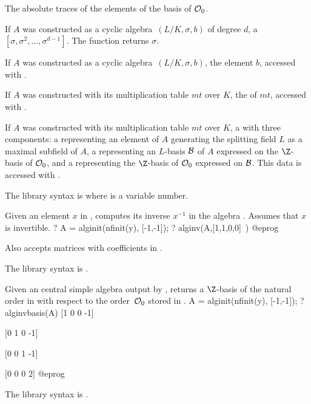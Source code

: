  \item The absolute traces of the elements of the basis of ${\cal O}_0$.

 \item If $A$ was constructed as a cyclic algebra~$(L/K,\sigma,b)$ of degree
$d$, a  $[\sigma,\sigma^2,\dots,\sigma^{d-1}]$. The function
 returns $\sigma$.

 \item If $A$ was constructed as a cyclic algebra~$(L/K,\sigma,b)$, the
element $b$, accessed with .

 \item If $A$ was constructed with its multiplication table $mt$ over $K$,
the  of  $mt$, accessed with .

 \item If $A$ was constructed with its multiplication table $mt$ over $K$,
a  with three components: a  representing an element of $A$
generating the splitting field $L$ as a maximal subfield of $A$, a 
representing an $L$-basis ${\cal B}$ of $A$ expressed on the $\Z$-basis of
${\cal O}_0$, and a  representing the $\Z$-basis of ${\cal O}_0$
expressed on ${\cal B}$. This data is accessed with .

The library syntax is  where  is a variable number.

\label{se:alginv}
Given an element $x$ in , computes its inverse $x^{-1}$ in the
algebra . Assumes that $x$ is invertible.
\bprog
? A = alginit(nfinit(y), [-1,-1]);
? alginv(A,[1,1,0,0]~)
@eprog

Also accepts matrices with coefficients in .

The library syntax is .

\label{se:alginvbasis}
Given an central simple algebra  output by , returns
a $\Z$-basis of the natural order in  with respect to the
order~${\cal O}_0$ stored in .
\bprog
A = alginit(nfinit(y), [-1,-1]);
? alginvbasis(A)
[1 0 0 -1]

[0 1 0 -1]

[0 0 1 -1]

[0 0 0  2]
@eprog

The library syntax is .

